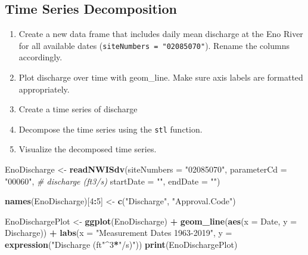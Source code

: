 \documentclass[]{article}
\newenvironment{Shaded}{\begin{snugshade}}{\end{snugshade}}
\newcommand{\CommentTok}[1]{\textcolor[rgb]{0.56,0.35,0.01}{\textit{#1}}}
\newcommand{\DataTypeTok}[1]{\textcolor[rgb]{0.13,0.29,0.53}{#1}}
\newcommand{\DecValTok}[1]{\textcolor[rgb]{0.00,0.00,0.81}{#1}}
\newcommand{\KeywordTok}[1]{\textcolor[rgb]{0.13,0.29,0.53}{\textbf{#1}}}
\newcommand{\NormalTok}[1]{#1}
\newcommand{\OperatorTok}[1]{\textcolor[rgb]{0.81,0.36,0.00}{\textbf{#1}}}
\newcommand{\StringTok}[1]{\textcolor[rgb]{0.31,0.60,0.02}{#1}}
\providecommand{\tightlist}{%
  \setlength{\itemsep}{0pt}\setlength{\parskip}{0pt}}
\begin{document}
\hypertarget{time-series-decomposition}{%
\subsection{Time Series Decomposition}\label{time-series-decomposition}}

\begin{enumerate}
\def\labelenumi{\arabic{enumi}.}
\setcounter{enumi}{4}
\tightlist
\item
  Create a new data frame that includes daily mean discharge at the Eno
  River for all available dates (\texttt{siteNumbers\ =\ "02085070"}).
  Rename the columns accordingly.
\item
  Plot discharge over time with geom\_line. Make sure axis labels are
  formatted appropriately.
\item
  Create a time series of discharge
\item
  Decompose the time series using the \texttt{stl} function.
\item
  Visualize the decomposed time series.
\end{enumerate}

\begin{Shaded}
\begin{Highlighting}[]
\NormalTok{EnoDischarge <-}\StringTok{ }\KeywordTok{readNWISdv}\NormalTok{(}\DataTypeTok{siteNumbers =} \StringTok{"02085070"}\NormalTok{,}
                     \DataTypeTok{parameterCd =} \StringTok{"00060"}\NormalTok{, }\CommentTok{# discharge (ft3/s)}
                     \DataTypeTok{startDate =} \StringTok{""}\NormalTok{,}
                     \DataTypeTok{endDate =} \StringTok{""}\NormalTok{)}

\KeywordTok{names}\NormalTok{(EnoDischarge)[}\DecValTok{4}\OperatorTok{:}\DecValTok{5}\NormalTok{] <-}\StringTok{ }\KeywordTok{c}\NormalTok{(}\StringTok{"Discharge"}\NormalTok{, }\StringTok{"Approval.Code"}\NormalTok{)}

\NormalTok{EnoDischargePlot <-}\StringTok{ }\KeywordTok{ggplot}\NormalTok{(EnoDischarge) }\OperatorTok{+}
\StringTok{  }\KeywordTok{geom_line}\NormalTok{(}\KeywordTok{aes}\NormalTok{(}\DataTypeTok{x =}\NormalTok{ Date, }\DataTypeTok{y =}\NormalTok{ Discharge)) }\OperatorTok{+}
\StringTok{  }\KeywordTok{labs}\NormalTok{(}\DataTypeTok{x =} \StringTok{"Measurement Dates 1963-2019"}\NormalTok{, }\DataTypeTok{y =} \KeywordTok{expression}\NormalTok{(}\StringTok{"Discharge (ft"}\OperatorTok{^}\DecValTok{3}\OperatorTok{*}\StringTok{"/s)"}\NormalTok{))}
\KeywordTok{print}\NormalTok{(EnoDischargePlot)}
\end{Highlighting}
\end{Shaded}
\end{document}
